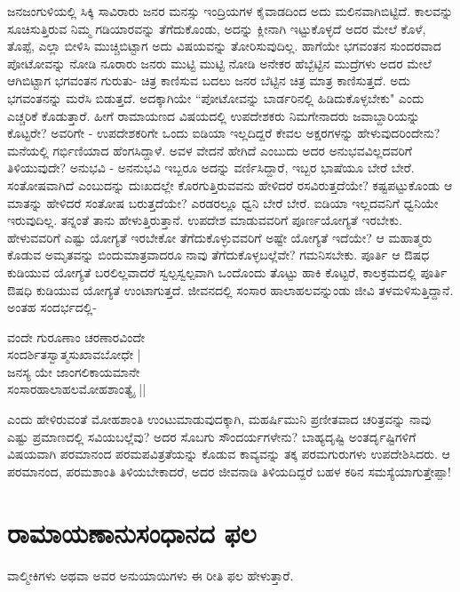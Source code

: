 ಜನಜಂಗುಳಿಯಲ್ಲಿ ಸಿಕ್ಕಿ ಸಾವಿರಾರು ಜನರ ಮನಸ್ಸು ಇಂದ್ರಿಯಗಳ ಕೈವಾಡದಿಂದ ಅದು ಮಲಿನವಾಗಿಬಿಟ್ಟಿದೆ. ಕಾಲವನ್ನು ಸೂಚಿಸುತ್ತಿರುವ ನಿಮ್ಮ ಗಡಿಯಾರವನ್ನು ತೆಗೆದುಕೊಂಡು, ಅದನ್ನು ಕ್ಲೀನಾಗಿ ಇಟ್ಟುಕೊಳ್ಳದೆ ಅದರ ಮೇಲೆ ಕೊಳೆ, ತೊಪ್ಪೆ, ಎಲ್ಲಾ ಬೀಳಿಸಿ ಮುಚ್ಚಿಬಿಟ್ಟಾಗ ಅದು ವಿಷಯವನ್ನು ತೋರಿಸುವುದಿಲ್ಲ. ಹಾಗೆಯೇ ಭಗವಂತನ ಸುಂದರವಾದ ಪೋಟೋವನ್ನು ನೋಡಿ ನೂರಾರು ಜನರು ಮುಟ್ಟಿ ಮುಟ್ಟಿ ನೋಡಿ ಅನೇಕರ ಹೆಬ್ಬೆಟ್ಟಿನ ಮುದ್ರೆಗಳು ಅದರ ಮೇಲೆ ಆಗಿಬಿಟ್ಟಾಗ ಭಗವಂತನ ಗುರುತು- ಚಿತ್ರ ಕಾಣಿಸುವ ಬದಲು ಜನರ ಬೆಟ್ಟಿನ ಚಿತ್ರ ಮಾತ್ರ ಕಾಣಿಸುತ್ತದೆ. ಅದು ಭಗವಂತನನ್ನು ಮರೆಸಿ ಬಿಡುತ್ತದೆ. ಅದಕ್ಕಾಗಿಯೇ ``ಪೋಟೋವನ್ನು ಬಾರ್ಡರಿನಲ್ಲಿ ಹಿಡಿದುಕೊಳ್ಳಬೇಕು" ಎಂದು ಎಚ್ಚರಿಕೆ ಕೊಡುತ್ತಾರೆ. ಹೀಗೆ ರಾಮಾಯಣದ ವಿಷಯದಲ್ಲಿ ಉಪದೇಶಕರು ನಿಮಗೇನಾದರು ಜವಾಬ್ದಾರಿಯನ್ನು ಕೊಟ್ಟರೇ? ಅವರಿಗೇ - ಉಪದೇಶಕರಿಗೇ ಒಂದು ಐಡಿಯಾ ಇಲ್ಲದಿದ್ದರೆ ಕೇವಲ ಅಕ್ಷರಗಳನ್ನು ಹೇಳುವುದರಿಂದೇನು? ಮನೆಯಲ್ಲಿ ಗರ್ಭಿಣಿಯಾದ ಹೆಂಗಸಿದ್ದಾಳೆ. ಅವಳ ವೇದನೆ ಹೇಗಿದೆ ಎಂಬುದು ಅದರ ಅನುಭವವಿಲ್ಲದವರಿಗೆ ತಿಳಿಯುವುದೇ? ಅನುಭವಿ - ಅನನುಭವಿ ಇಬ್ಬರೂ ಅದನ್ನು ವರ್ಣಿಸಿದ್ದಾರೆ, ಇಬ್ಬರ ಭಾಷೆಯೂ ಬೇರೆ ಬೇರೆ. ಸಂತೋಷವಾಗಿದೆ ಎಂಬುದನ್ನು ದುಃಖದಲ್ಲೇ ಕೊರಗುತ್ತಿರುವವನು ಹೇಳಿದರೆ ರಸವಿರುತ್ತದೆಯೇ? ಕಷ್ಟಪಟ್ಟುಕೊಂಡು ಆ ಮಾತನ್ನು ಹೇಳಿದರೆ ಸಂತೋಷ ಬರುತ್ತದೆಯೇ? ಎರಡರಲ್ಲೂ ಧ್ವನಿ ಬೇರೆ ಬೇರೆ. ಐಡಿಯಾ ಇಲ್ಲದವನಿಗೆ ಧ್ವನಿಯೇ ಇರುವುದಿಲ್ಲ. ತನ್ನಂತೆ ತಾನು ಹೇಳುತ್ತಿರುತ್ತಾನೆ. ಉಪದೇಶ ಮಾಡುವವರಿಗೆ ಪೂರ್ಣಯೋಗ್ಯತೆ ಇರಬೇಕು. ಹೇಳುವವರಿಗೆ ಎಷ್ಟು ಯೋಗ್ಯತೆ ಇರಬೇಕೋ ತೆಗೆದುಕೊಳ್ಳುವವರಿಗೆ ಅಷ್ಟೇ ಯೋಗ್ಯತೆ ಇದೆಯೇ? ಆ ಮಹಾತ್ಮರು ಕೊಡುವ ಅಮೃತವನ್ನು ಬಿಂದುಮಾತ್ರವಾದರೂ ನಾವು ತೆಗೆದುಕೊಳ್ಳಬಲ್ಲೆವೇ? ಗಮನಿಸಬೇಕು. ಪೂರ್ತಿ ಆ ಔಷಧ ಕುಡಿಯುವ ಯೋಗ್ಯತೆ ಬರಲಿಲ್ಲವಾದರೆ ಸ್ವಲ್ಪಸ್ವಲ್ಪವಾಗಿ ಒಂದೊಂದು ತೊಟ್ಟು ಹಾಕಿ ಕೊಟ್ಟರೆ, ಕಾಲಕ್ರಮದಲ್ಲಿ ಪೂರ್ತಿ ಔಷಧಿ ಕುಡಿಯುವ ಯೋಗ್ಯತೆ ಉಂಟಾಗುತ್ತದೆ. ಜೀವನದಲ್ಲಿ ಸಂಸಾರ ಹಾಲಾಹಲವನ್ನುಂಡು ಜೀವಿ ತಳಮಳಿಸುತ್ತಿದ್ದಾನೆ. ಅಂತಹ ಸಂದರ್ಭದಲ್ಲಿ- 


\begin{shloka}
ವಂದೇ ಗುರೂಣಾಂ ಚರಣಾರವಿಂದೇ\label{180a}\\ 
ಸಂದರ್ಶಿತಸ್ವಾತ್ಮಸುಖಾವಬೋಧೇ |\\ 
ಜನಸ್ಯ ಯೇ ಜಾಂಗಲಿಕಾಯಮಾನೇ\\ 
ಸಂಸಾರಹಾಲಾಹಲಮೋಹಶಾಂತ್ಯೈ ||
\end{shloka} 


ಎಂದು ಹೇಳಿರುವಂತೆ ಮೋಹಶಾಂತಿ ಉಂಟುಮಾಡುವುದಕ್ಕಾಗಿ, ಮಹರ್ಷಿಮುನಿ ಪ್ರಣೀತವಾದ ಚರಿತ್ರವನ್ನು ನಾವು ಎಷ್ಟು ಪ್ರಮಾಣದಲ್ಲಿ ಸವಿಯಬಲ್ಲೆವು? ಅದರ ಸೊಬಗು ಸೌಂದರ್ಯಗಳೇನು? ಬಾಹ್ಯದೃಷ್ಟಿ ಅಂತರ್ದೃಷ್ಟಿಗಳಿಗೆ ವಿಷಯವಾಗಿ ಪರಮಾನಂದ ಪರಮಪವಿತ್ರತೆಯನ್ನು ಕೊಡುವ ಕಾವ್ಯವನ್ನು ತಕ್ಕ ಪರಮಗುರುಗಳು ಉಪದೇಶಿಸಿದರು. ಆ ಪರಮಾನಂದ, ಪರಮಶಾಂತಿ ತಿಳಿಯಬೇಕಾದರೆ, ಅದರ ಜೀವನಾಡಿ ತಿಳಿಯದಿದ್ದರೆ ಬಹಳ ಕಠಿನ ಸಮಸ್ಯೆಯಾಗುತ್ತೇಪ್ಪಾ! 


\section*{ರಾಮಾಯಣಾನುಸಂಧಾನದ ಫಲ}

ವಾಲ್ಮೀಕಿಗಳು ಅಥವಾ ಅವರ ಅನುಯಾಯಿಗಳು ಈ ರೀತಿ ಫಲ ಹೇಳುತ್ತಾರೆ. 

